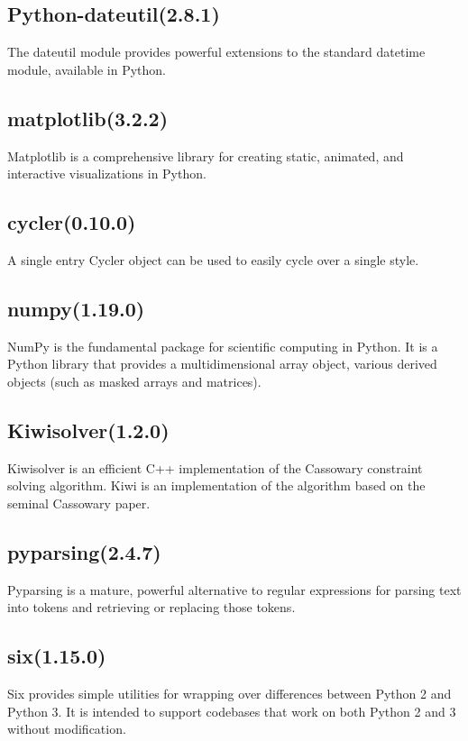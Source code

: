\documentclass[11pt,a4paper]{report}
\begin{document}
{\subsection*{Python-dateutil(2.8.1)}
{The dateutil module provides powerful extensions to the standard datetime module, available in Python.}

\subsection*{matplotlib(3.2.2)}
{Matplotlib is a comprehensive library for creating static, animated, and interactive visualizations in Python.}

\subsection*{cycler(0.10.0)}
{A single entry Cycler object can be used to easily cycle over a single style.}


\subsection*{numpy(1.19.0)}
{NumPy is the fundamental package for scientific computing in Python. It is a Python library that provides a multidimensional array object, various derived objects (such as masked arrays and matrices).}

\subsection*{Kiwisolver(1.2.0)}
{Kiwisolver is an efficient C++ implementation of the Cassowary constraint solving algorithm. Kiwi is an implementation of the algorithm based on the seminal Cassowary paper.}

\subsection*{pyparsing(2.4.7)}
{Pyparsing is a mature, powerful alternative to regular expressions for parsing text into tokens and retrieving or replacing those tokens.}

\subsection*{six(1.15.0)}
{Six provides simple utilities for wrapping over differences between Python 2 and Python 3. It is intended to support codebases that work on both Python 2 and 3 without modification.}
}
\end{document}
